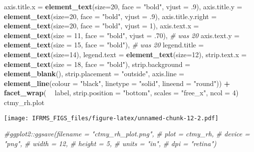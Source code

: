 \documentclass[
]{article}
\newenvironment{Shaded}{\begin{snugshade}}{\end{snugshade}}
\newcommand{\CommentTok}[1]{\textcolor[rgb]{0.56,0.35,0.01}{\textit{#1}}}
\newcommand{\DataTypeTok}[1]{\textcolor[rgb]{0.13,0.29,0.53}{#1}}
\newcommand{\DecValTok}[1]{\textcolor[rgb]{0.00,0.00,0.81}{#1}}
\newcommand{\FloatTok}[1]{\textcolor[rgb]{0.00,0.00,0.81}{#1}}
\newcommand{\KeywordTok}[1]{\textcolor[rgb]{0.13,0.29,0.53}{\textbf{#1}}}
\newcommand{\NormalTok}[1]{#1}
\newcommand{\OperatorTok}[1]{\textcolor[rgb]{0.81,0.36,0.00}{\textbf{#1}}}
\newcommand{\StringTok}[1]{\textcolor[rgb]{0.31,0.60,0.02}{#1}}
\begin{document}
\begin{Shaded}
\begin{Highlighting}[]
          \DataTypeTok{axis.title.x =} \KeywordTok{element_text}\NormalTok{(}\DataTypeTok{size=}\DecValTok{20}\NormalTok{, }\DataTypeTok{face =} \StringTok{"bold"}\NormalTok{, }\DataTypeTok{vjust =} \FloatTok{.9}\NormalTok{),}
          \DataTypeTok{axis.title.y =} \KeywordTok{element_text}\NormalTok{(}\DataTypeTok{size=}\DecValTok{20}\NormalTok{, }\DataTypeTok{face =} \StringTok{"bold"}\NormalTok{, }\DataTypeTok{vjust =} \FloatTok{.9}\NormalTok{),}
          \DataTypeTok{axis.title.y.right =} \KeywordTok{element_text}\NormalTok{(}\DataTypeTok{size=}\DecValTok{20}\NormalTok{, }\DataTypeTok{face =} \StringTok{"bold"}\NormalTok{, }\DataTypeTok{vjust =} \DecValTok{1}\NormalTok{),}
          \DataTypeTok{axis.text.x =} \KeywordTok{element_text}\NormalTok{(}\DataTypeTok{size =} \DecValTok{11}\NormalTok{, }\DataTypeTok{face =} \StringTok{"bold"}\NormalTok{, }\DataTypeTok{vjust =} \FloatTok{.70}\NormalTok{), }\CommentTok{# was 20}
          \DataTypeTok{axis.text.y =} \KeywordTok{element_text}\NormalTok{(}\DataTypeTok{size =} \DecValTok{15}\NormalTok{, }\DataTypeTok{face =} \StringTok{"bold"}\NormalTok{), }\CommentTok{# was 20}
          \DataTypeTok{legend.title =} \KeywordTok{element_text}\NormalTok{(}\DataTypeTok{size=}\DecValTok{14}\NormalTok{), }
          \DataTypeTok{legend.text =} \KeywordTok{element_text}\NormalTok{(}\DataTypeTok{size=}\DecValTok{12}\NormalTok{),}
          \DataTypeTok{strip.text.x =} \KeywordTok{element_text}\NormalTok{(}\DataTypeTok{size =} \DecValTok{18}\NormalTok{, }\DataTypeTok{face =} \StringTok{"bold"}\NormalTok{),}
          \DataTypeTok{strip.background =} \KeywordTok{element_blank}\NormalTok{(),}
          \DataTypeTok{strip.placement =} \StringTok{"outside"}\NormalTok{,}
          \DataTypeTok{axis.line =} \KeywordTok{element_line}\NormalTok{(}\DataTypeTok{colour =} \StringTok{"black"}\NormalTok{, }\DataTypeTok{linetype =} \StringTok{"solid"}\NormalTok{, }\DataTypeTok{lineend =} \StringTok{"round"}\NormalTok{)) }\OperatorTok{+}
\StringTok{  }\KeywordTok{facet_wrap}\NormalTok{( }\OperatorTok{~}\StringTok{ }\NormalTok{label, }\DataTypeTok{strip.position =} \StringTok{"bottom"}\NormalTok{, }\DataTypeTok{scales =} \StringTok{"free_x"}\NormalTok{, }\DataTypeTok{ncol =} \DecValTok{4}\NormalTok{)}
\NormalTok{ctmy_rh.plot}
\end{Highlighting}
\end{Shaded}

\texttt{[image: IFRMS\_FIGS\_files/figure-latex/unnamed-chunk-12-2.pdf]}

\begin{Shaded}
\begin{Highlighting}[]
\CommentTok{#ggplot2::ggsave(filename = "ctmy_rh_plot.png",}
\CommentTok{#                 plot = ctmy_rh,}
\CommentTok{#                 device = "png",}
\CommentTok{#                 width = 12,}
\CommentTok{#                 height = 5, }
\CommentTok{#                 units = "in",}
\CommentTok{#                 dpi = "retina")}
\end{Highlighting}
\end{Shaded}
\end{document}
